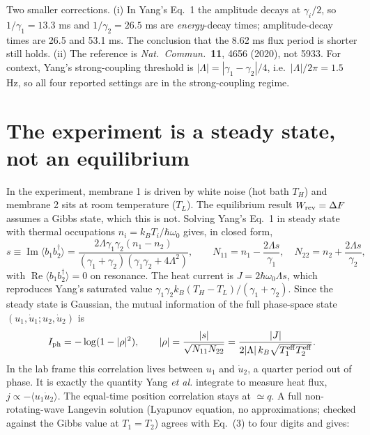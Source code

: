 \documentclass[9pt]{article}
\begin{document}
Two smaller corrections. (i) In Yang's Eq.~1 the amplitude decays at $\gamma_i/2$, so $1/\gamma_1=13.3$ ms and $1/\gamma_2=26.5$ ms are \emph{energy}-decay times; amplitude-decay times are 26.5 and 53.1 ms. The conclusion that the 8.62 ms flux period is shorter still holds. (ii) The reference is \emph{Nat.\ Commun.}\ \textbf{11}, 4656 (2020), not 5933. For context, Yang's strong-coupling threshold is $|\Lambda|=|\gamma_1-\gamma_2|/4$, i.e.\ $|\Lambda|/2\pi=1.5$ Hz, so all four reported settings are in the strong-coupling regime.

\section{The experiment is a steady state, not an equilibrium}
In the experiment, membrane 1 is driven by white noise (hot bath $T_H$) and membrane 2 sits at room temperature ($T_L$). The equilibrium result $W_{\rm rev}=\Delta F$ assumes a Gibbs state, which this is not. Solving Yang's Eq.~1 in steady state with thermal occupations $n_i=k_BT_i/\hbar\omega_0$ gives, in closed form,
\begin{equation}
 s\equiv\operatorname{Im}\langle b_1b_2^\dagger\rangle=\frac{2\Lambda\gamma_1\gamma_2(n_1-n_2)}{(\gamma_1+\gamma_2)(\gamma_1\gamma_2+4\Lambda^2)},\qquad
 N_{11}=n_1-\frac{2\Lambda s}{\gamma_1},\quad N_{22}=n_2+\frac{2\Lambda s}{\gamma_2},
\end{equation}
with $\operatorname{Re}\langle b_1b_2^\dagger\rangle=0$ on resonance. The heat current is $J=2\hbar\omega_0\Lambda s$, which reproduces Yang's saturated value $\gamma_1\gamma_2k_B(T_H-T_L)/(\gamma_1+\gamma_2)$. Since the steady state is Gaussian, the mutual information of the full phase-space state $(u_1,\dot u_1;u_2,\dot u_2)$ is
\begin{equation}
 I_{\rm ph}=-\log(1-|\rho|^2),\qquad |\rho|=\frac{|s|}{\sqrt{N_{11}N_{22}}}=\frac{|J|}{2|\Lambda|\,k_B\sqrt{T_1^{\rm eff}T_2^{\rm eff}}}.
\end{equation}
In the lab frame this correlation lives between $u_1$ and $\dot u_2$, a quarter period out of phase. It is exactly the quantity Yang \emph{et al.} integrate to measure heat flux, $j\propto-\langle u_1\dot u_2\rangle$. The equal-time position correlation stays at $\simeq q$. A full non-rotating-wave Langevin solution (Lyapunov equation, no approximations; checked against the Gibbs value at $T_1=T_2$) agrees with Eq.~(3) to four digits and gives:
\end{document}
